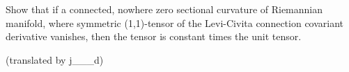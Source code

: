 Show that if a connected, nowhere zero sectional curvature of Riemannian manifold, where symmetric (1,1)-tensor of the Levi-Civita connection covariant derivative vanishes, then the tensor is constant times the unit tensor.

(translated by j___d)